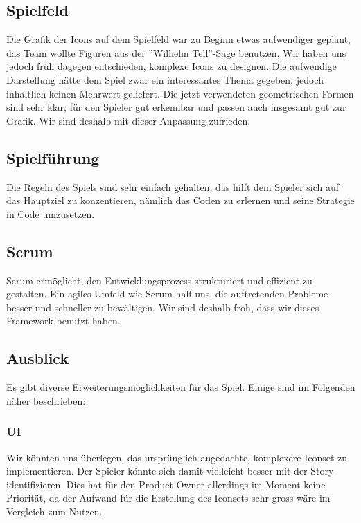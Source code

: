 \documentclass[11pt,a4paper,titlepage]{article}
\begin{document}
\subsection{Spielfeld}

Die Grafik der Icons auf dem Spielfeld war zu Beginn etwas aufwendiger geplant, das Team wollte Figuren aus der ''Wilhelm Tell''-Sage benutzen. Wir haben uns jedoch früh dagegen entschieden, komplexe Icons zu designen. Die aufwendige Darstellung hätte dem Spiel zwar ein interessantes Thema gegeben, jedoch inhaltlich keinen Mehrwert geliefert. Die jetzt verwendeten geometrischen Formen sind sehr klar, für den Spieler gut erkennbar und passen auch insgesamt gut zur Grafik. Wir sind deshalb mit dieser Anpassung zufrieden.

\subsection{Spielführung}

Die Regeln des Spiels sind sehr einfach gehalten, das hilft dem Spieler sich auf das Hauptziel zu konzentieren, nämlich das Coden zu erlernen und seine Strategie in Code umzusetzen.

\subsection{Scrum}
Scrum ermöglicht, den Entwicklungsprozess strukturiert und effizient zu gestalten. Ein agiles Umfeld wie Scrum half uns, die auftretenden Probleme besser und schneller zu bewältigen. Wir sind deshalb froh, dass wir dieses Framework benutzt haben.

\subsection{Ausblick}

Es gibt diverse Erweiterungsmöglichkeiten für das Spiel. Einige sind im Folgenden näher beschrieben:

\subsubsection{UI}
Wir könnten uns überlegen, das ursprünglich angedachte, komplexere Iconset zu implementieren. Der Spieler könnte sich damit vielleicht besser mit der Story identifizieren. Dies hat für den Product Owner allerdings im Moment keine Priorität, da der Aufwand für die Erstellung des Iconsets sehr gross wäre im Vergleich zum Nutzen.
\end{document}
